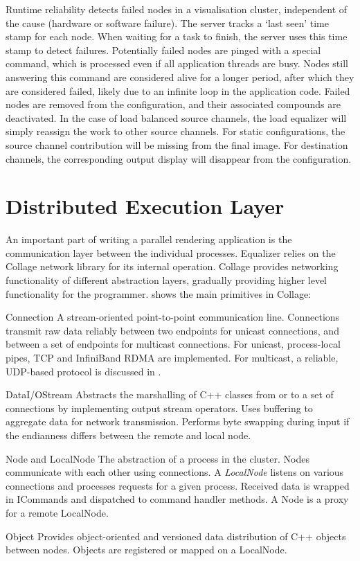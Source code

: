Runtime reliability detects failed nodes in a visualisation cluster,
independent of the cause (hardware or software failure). The server tracks a
`last seen' time stamp for each node. When waiting for a task to finish, the
server uses this time stamp to detect failures. Potentially failed nodes are
pinged with a special command, which is processed even if all application
threads are busy. Nodes still answering this command are considered alive for a
longer period, after which they are considered failed, likely due to an
infinite loop in the application code. Failed nodes are removed from the
configuration, and their associated compounds are deactivated. In the case of
load balanced source channels, the load equalizer will simply reassign the work
to other source channels. For static configurations, the source channel
contribution will be missing from the final image. For destination channels,
the corresponding output display will disappear from the configuration.

\section{Distributed Execution Layer}

An important part of writing a parallel rendering application is the
communication layer between the individual processes. Equalizer relies on the
Collage network library for its internal operation. Collage provides networking
functionality of different abstraction layers, gradually providing higher level
functionality for the programmer.  shows the main primitives in
Collage:

\begin{compactdesc}
\item[Connection] A stream-oriented point-to-point communication
  line. Connections
  transmit raw data reliably between two endpoints for unicast connections, and
  between a set of endpoints for multicast connections. For unicast,
  process-local pipes, TCP and InfiniBand RDMA are implemented. For multicast,
  a reliable, UDP-based protocol is discussed in .
\item[DataI/OStream] Abstracts the marshalling of C++ classes from or to
  a set of connections by implementing output stream operators. Uses buffering
  to aggregate data for network transmission. Performs byte swapping during
  input if the endianness differs between the remote and local node.
\item[Node and LocalNode] The abstraction of a process in the cluster. Nodes
  communicate with each other using connections. A {\em LocalNode} listens on various
  connections and processes requests for a given process. Received data is
  wrapped in ICommands and dispatched to command handler methods. A Node is a
  proxy for a remote LocalNode.
\item[Object] Provides object-oriented and versioned data distribution of C++
  objects between nodes. Objects are registered or mapped on a Local\-Node.
\end{compactdesc}

